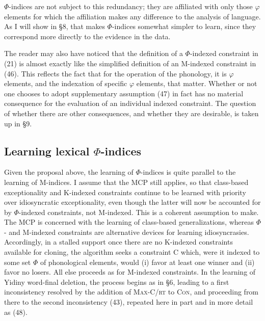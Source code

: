 \documentclass[output=paper,
modfonts
]{LSP/langsci}
\begin{document}
\noindent $\Phi $-indices are not subject to this redundancy; they are affiliated with only those $\varphi $ elements for which the affiliation makes any difference to the analysis of language. As I will show in §8, that makes $\Phi $-indices somewhat simpler to learn, since they correspond more directly to the evidence in the data. 

The reader may also have noticed that the definition of a $\Phi $-indexed constraint in (21) is almost exactly like the simplified definition of an M-indexed constraint in (46). This reflects the fact that for the operation of the phonology, it is $\varphi $ elements, and the indexation of specific $\varphi $ elements, that matter. Whether or not one chooses to adopt supplementary assumption (47) in fact has no material consequence for the evaluation of an individual indexed constraint. The question of whether there are other consequences, and whether they are desirable, is taken up in §9.

\subsection[Learning lexical $\Phi ${}-indices]{Learning lexical $\Phi $-indices}
\label{bkm:Ref335244838}
Given the proposal above, the learning of $\Phi $-indices is quite parallel to the learning of M-indices. I assume that the MCP still applies, so that class-based exceptionality and K-indexed constraints continue to be learned with priority over idiosyncratic exceptionality, even though the latter will now be accounted for by $\Phi $-indexed constraints, not M-indexed. This is a coherent assumption to make. The MCP is concerned with the learning of class-based generalizations, whereas $\Phi $- and M-indexed constraints are alternative devices for learning idiosyncrasies. Accordingly, in a stalled support once there are no K-indexed constraints available for cloning, the algorithm seeks a constraint C which, were it indexed to some set $\Phi $\textit{} of phonological elements, would (i) favor at least one winner and (ii) favor no losers. All else proceeds as for M-indexed constraints. In the learning of Yidiny word-final deletion, the process begins as in §6, leading to a first inconsistency resolved by the addition of \textsc{Max-C/rt} to \textsc{Con}, and proceeding from there to the second inconsistency (43), repeated here in part and in more detail as (48).
\end{document}
